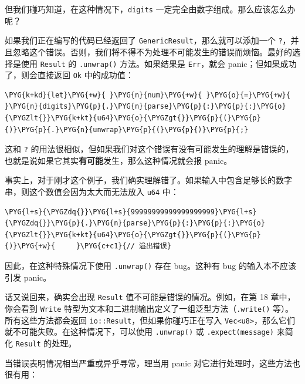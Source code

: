 但我们碰巧知道，在这种情况下，\texttt{digits} 一定完全由数字组成。那么应该怎么办呢？

如果我们正在编写的代码已经返回了 \texttt{GenericResult}，那么就可以添加一个 \texttt{?}，并且忽略这个错误。否则，我们将不得不为处理不可能发生的错误而烦恼。最好的选择是使用 \texttt{Result} 的 \texttt{.unwrap()} 方法。如果结果是 \texttt{Err}，就会 panic；但如果成功了，则会直接返回 \texttt{Ok} 中的成功值：

\begin{Verbatim}[commandchars=\\\{\},breaklines=true,breakanywhere=true,fontsize=\codefont,xleftmargin=17bp]
\PYG{k+kd}{let}\PYG{+w}{ }\PYG{n}{num}\PYG{+w}{ }\PYG{o}{=}\PYG{+w}{ }\PYG{n}{digits}\PYG{p}{.}\PYG{n}{parse}\PYG{p}{:}\PYG{p}{:}\PYG{o}{\PYGZlt{}}\PYG{k+kt}{u64}\PYG{o}{\PYGZgt{}}\PYG{p}{(}\PYG{p}{)}\PYG{p}{.}\PYG{n}{unwrap}\PYG{p}{(}\PYG{p}{)}\PYG{p}{;}
\end{Verbatim}

这和 \texttt{?} 的用法很相似，但如果我们对这个错误有没有可能发生的理解是错误的，也就是说如果它其实\textbf{有可能}发生，那么这种情况就会报 panic。

事实上，对于刚才这个例子，我们确实理解错了。如果输入中包含足够长的数字串，则这个数值会因为太大而无法放入 \texttt{u64} 中：

\begin{Verbatim}[commandchars=\\\{\},breaklines=true,breakanywhere=true,fontsize=\codefont,xleftmargin=17bp]
\PYG{l+s}{\PYGZdq{}}\PYG{l+s}{99999999999999999999}\PYG{l+s}{\PYGZdq{}}\PYG{p}{.}\PYG{n}{parse}\PYG{p}{:}\PYG{p}{:}\PYG{o}{\PYGZlt{}}\PYG{k+kt}{u64}\PYG{o}{\PYGZgt{}}\PYG{p}{(}\PYG{p}{)}\PYG{+w}{     }\PYG{c+c1}{// 溢出错误}
\end{Verbatim}

因此，在这种特殊情况下使用 \texttt{.unwrap()} 存在 bug。这种有 bug 的输入本不应该引发 panic。

话又说回来，确实会出现 \texttt{Result} 值不可能是错误的情况。例如，在第 18 章中，你会看到 \texttt{Write} 特型为文本和二进制输出定义了一组泛型方法（\texttt{.write()} 等）。所有这些方法都会返回 \texttt{io::Result}，但如果你碰巧正在写入 \texttt{Vec<u8>}，那么它们就不可能失败。在这种情况下，可以使用 \texttt{.unwrap()} 或 \texttt{.expect(message)} 来简化 \texttt{Result} 的处理。

当错误表明情况相当严重或异乎寻常，理当用 panic 对它进行处理时，这些方法也很有用：

